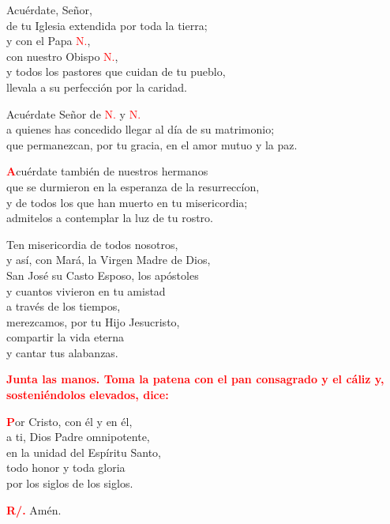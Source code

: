 \documentclass[12pt, letterpaper]{report}
\begin{document}
  Acu\'erdate, Se\~nor,\\
  de tu Iglesia extendida por toda la tierra; \\
  y con el Papa \textcolor{red}{N.},\\
  con nuestro Obispo \textcolor{red}{N.},\\
  y todos los pastores que cuidan de tu pueblo,\\
  llevala a su perfecci\'on por la caridad.

  Acu\'erdate Se\~nor de \textcolor{red}{N.} y \textcolor{red}{N.} \\
  a quienes has concedido llegar al d\'ia de su matrimonio; \\
  que permanezcan, por tu gracia, en el amor mutuo y la paz.

  \lettrine[lines=2]{\bfseries \textcolor{red}{A}}{}\Large cu\'erdate tambi\'en de nuestros hermanos\\
  que se durmieron en la esperanza de la resurrecc\'ion,\\
  y de todos los que han muerto en tu misericordia;\\
  admitelos a contemplar la luz de tu rostro.

  Ten misericordia de todos nosotros,\\
  y as\'i, con Mar\'a, la Virgen Madre de Dios,\\
  San Jos\'e su Casto Esposo, los ap\'ostoles\\
  y cuantos vivieron en tu amistad\\
  a trav\'es de los tiempos,\\
  merezcamos, por tu Hijo Jesucristo,\\
  compartir la vida eterna\\
  y cantar tus alabanzas.

  \large{\bfseries \textcolor{red}{Junta las manos. Toma la patena con el pan consagrado y el c\'aliz y, sosteni\'endolos elevados, dice:}}
  
  \lettrine[lines=2]{\bfseries \textcolor{red}{P}}{}\Large or Cristo, con \'el y en \'el,\\
  a ti, Dios Padre omnipotente,\\
  en la unidad del Esp\'iritu Santo,\\
  todo honor y toda gloria\\
  por los siglos de los siglos.

  \Large \hspace{-0.9cm} {\bfseries \textcolor{red}{R/.}} \hspace{0.5cm} Am\'en.
\end{document}
